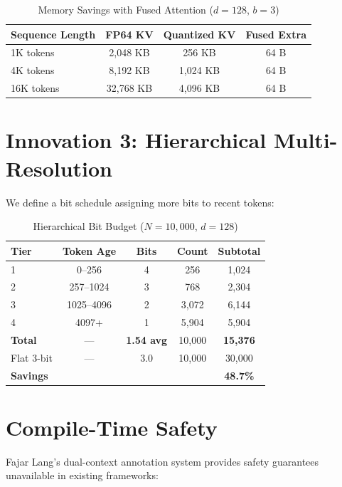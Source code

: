 \documentclass[10pt,twocolumn]{article}
\begin{document}
\begin{table}[t]
\centering
\caption{Memory Savings with Fused Attention ($d{=}128$, $b{=}3$)}
\label{tab:memory}
\begin{tabular}{lccc}
\toprule
Sequence Length & FP64 KV & Quantized KV & Fused Extra \\
\midrule
1K tokens & 2,048 KB & 256 KB & 64 B \\
4K tokens & 8,192 KB & 1,024 KB & 64 B \\
16K tokens & 32,768 KB & 4,096 KB & 64 B \\
\bottomrule
\end{tabular}
\end{table}

\section{Innovation 3: Hierarchical Multi-Resolution}

We define a bit schedule assigning more bits to recent tokens:

\begin{table}[t]
\centering
\caption{Hierarchical Bit Budget ($N{=}10{,}000$, $d{=}128$)}
\label{tab:budget}
\begin{tabular}{lcccc}
\toprule
Tier & Token Age & Bits & Count & Subtotal \\
\midrule
1 & 0--256 & 4 & 256 & 1,024 \\
2 & 257--1024 & 3 & 768 & 2,304 \\
3 & 1025--4096 & 2 & 3,072 & 6,144 \\
4 & 4097+ & 1 & 5,904 & 5,904 \\
\midrule
\textbf{Total} & --- & \textbf{1.54 avg} & 10,000 & \textbf{15,376} \\
Flat 3-bit & --- & 3.0 & 10,000 & 30,000 \\
\textbf{Savings} & & & & \textbf{48.7\%} \\
\bottomrule
\end{tabular}
\end{table}

\section{Compile-Time Safety}

Fajar Lang's dual-context annotation system provides safety guarantees unavailable in existing frameworks:
\end{document}
